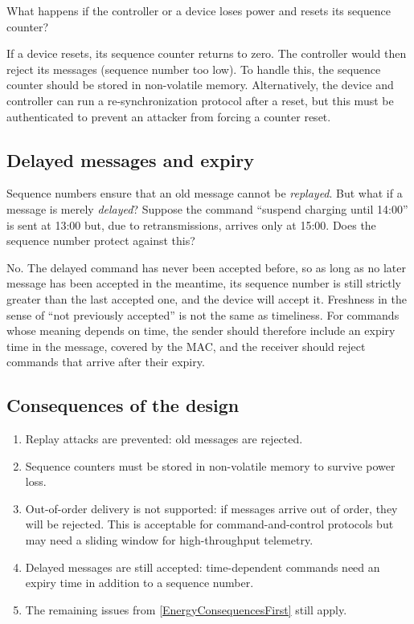\begin{exercise}
  What happens if the controller or a device loses power and resets its
  sequence counter?
\end{exercise}

If a device resets, its sequence counter returns to zero.
The controller would then reject its messages (sequence number too low).
To handle this, the sequence counter should be stored in non-volatile memory.
Alternatively, the device and controller can run a re-synchronization
protocol after a reset, but this must be authenticated to prevent an
attacker from forcing a counter reset.

\subsection{Delayed messages and expiry}

\begin{exercise}
  Sequence numbers ensure that an old message cannot be \emph{replayed}.
  But what if a message is merely \emph{delayed}?
  Suppose the command \enquote{suspend charging until 14:00} is sent at
  13:00 but, due to retransmissions, arrives only at 15:00.
  Does the sequence number protect against this?
\end{exercise}

No.
The delayed command has never been accepted before, so as long as no later
message has been accepted in the meantime, its sequence number is still
strictly greater than the last accepted one, and the device will accept it.
Freshness in the sense of \enquote{not previously accepted} is not the same
as timeliness.
For commands whose meaning depends on time, the sender should therefore
include an expiry time in the message, covered by the MAC, and the receiver
should reject commands that arrive after their expiry.

\subsection{Consequences of the design}

\begin{enumerate}
  \item Replay attacks are prevented: old messages are rejected.
  \item Sequence counters must be stored in non-volatile memory to survive
    power loss.
  \item Out-of-order delivery is not supported: if messages arrive out of
    order, they will be rejected.
    This is acceptable for command-and-control protocols but may need a
    sliding window for high-throughput telemetry.
  \item Delayed messages are still accepted: time-dependent commands need
    an expiry time in addition to a sequence number.
  \item The remaining issues from \cref{EnergyConsequencesFirst} still
    apply.
\end{enumerate}



